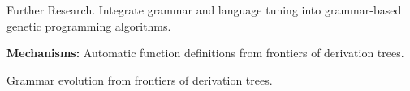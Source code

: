 \begin{frame}
\vspace*{2mm}
\begin{block}{
Further Research.
}
Integrate grammar and language tuning
into grammar-based genetic programming algorithms.
  
{\bf Mechanisms:}
Automatic function definitions from frontiers of derivation trees.
 
Grammar evolution from frontiers of derivation trees.
\end{block}
\end{frame}